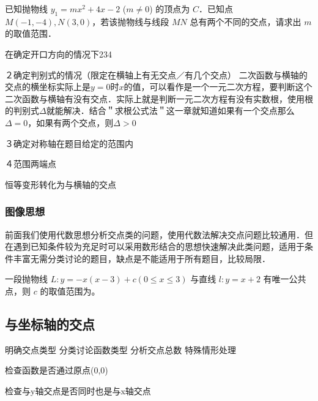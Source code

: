 \begin{example}
已知抛物线 \( y_1 = mx^2 + 4x - 2 \) (\( m \neq 0 \)) 的顶点为 \( C \)．已知点 \( M(-1, -4), N(3, 0) \)，若该抛物线与线段 \( MN \) 总有两个不同的交点，请求出 \( m \) 的取值范围．
\end{example}




在确定开口方向的情况下234

２确定判别式的情况（限定在横轴上有无交点／有几个交点）
二次函数与横轴的交点的横坐标实际上是\(y=0\)时\(x\)的值，可以看作是一个一元二次方程，要判断这个二次函数与横轴有没有交点．实际上就是判断一元二次方程有没有实数根，使用根的判别式\(\Delta\)就能解决．结合＂求根公式法＂这一章就知道如果有一个交点那么\(\Delta=0\)，如果有两个交点，则\(\Delta>0\)



３确定对称轴在题目给定的范围内


４范围两端点




恒等变形转化为与横轴的交点






\subsubsection*{图像思想}

前面我们使用代数思想分析交点类的问题，使用代数法解决交点问题比较通用．但在遇到已知条件较为充足时可以采用数形结合的思想快速解决此类问题，适用于条件丰富无需分类讨论的题目，缺点是不能适用于所有题目，比较局限．

\begin{example}
一段抛物线 \( L: y = -x (x-3) + c \)\( (0 \leq x \leq 3) \) 与直线 \( l: y = x + 2 \) 有唯一公共点，则 \( c \) 的取值范围为\underline{\hspace{4em}}。
\end{example}

\subsection{与坐标轴的交点}
明确交点类型
分类讨论函数类型
分析交点总数
特殊情形处理

检查函数是否通过原点(0,0)

检查与y轴交点是否同时也是与x轴交点
